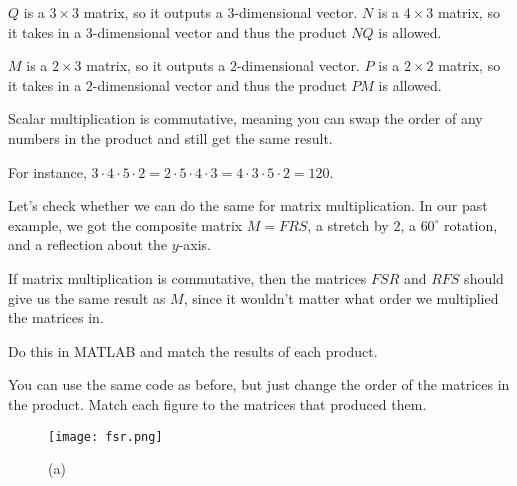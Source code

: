 \documentclass{ximera}
\begin{document}
\begin{exploration}
\begin{example}
\begin{solution}
            $Q$ is a $3\times 3$ matrix, so it outputs a $3$-dimensional vector. $N$ is a $4\times 3$ matrix, so it takes in a $3$-dimensional vector and thus the product $NQ$ is allowed.

            $M$ is a $2\times 3$ matrix, so it outputs a $2$-dimensional vector. $P$ is a $2\times 2$ matrix, so it takes in a $2$-dimensional vector and thus the product $PM$ is allowed.

        \end{solution}

    \end{example}

    \begin{example}

        Scalar multiplication is commutative, meaning you can swap the order of any numbers in the product and still get the same result.

        For instance, $3\cdot 4\cdot 5\cdot 2=2\cdot 5\cdot 4\cdot 3=4\cdot 3\cdot 5\cdot 2=120$.

        Let's check whether we can do the same for matrix multiplication. In our past example, we got the composite matrix $M=FRS$, a stretch by $2$, a $60^\circ$ rotation, and a reflection about the $y$-axis.

        If matrix multiplication is commutative, then the matrices $FSR$ and $RFS$ should give us the same result as $M$, since it wouldn't matter what order we multiplied the matrices in.

        Do this in MATLAB and match the results of each product.

        \begin{hint}

            You can use the same code as before, but just change the order of the matrices in the product. Match each figure to the matrices that produced them.

        \end{hint}

        \begin{figure}[ht!]
            \centering
            \texttt{[image: fsr.png]}
            \caption{(a)}
        \end{figure}
        
        \begin{selectAll}



\end{selectAll}
\end{example}
\end{exploration}
\end{document}
